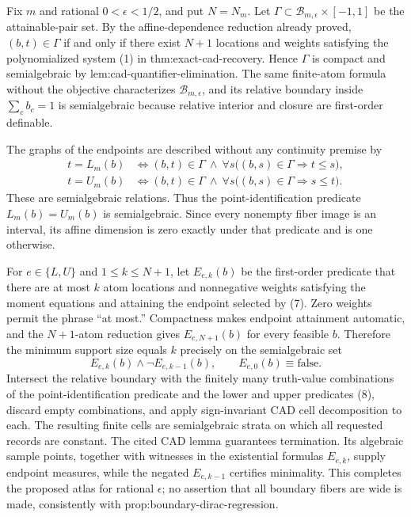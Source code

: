 Fix \(m\) and rational \(0<\epsilon<1/2\), and put \(N=N_m\).  Let \(\Gamma\subset\mathcal B_{m,\epsilon}\times[-1,1]\) be the attainable-pair set.  By the affine-dependence reduction already proved, \((b,t)\in\Gamma\) if and only if there exist \(N+1\) locations and weights satisfying the polynomialized system (1) in thm:exact-cad-recovery.  Hence \(\Gamma\) is compact and semialgebraic by lem:cad-quantifier-elimination.  The same finite-atom formula without the objective characterizes \(\mathcal B_{m,\epsilon}\), and its relative boundary inside \(\sum_cb_c=1\) is semialgebraic because relative interior and closure are first-order definable.

The graphs of the endpoints are described without any continuity premise by
\[
 \begin{aligned}
 t=L_m(b)&\Longleftrightarrow (b,t)\in\Gamma
 \ \wedge\ \forall s\bigl((b,s)\in\Gamma\Rightarrow t\leq s\bigr),\\
 t=U_m(b)&\Longleftrightarrow (b,t)\in\Gamma
 \ \wedge\ \forall s\bigl((b,s)\in\Gamma\Rightarrow s\leq t\bigr).
 \end{aligned}
\tag{7}
\]
These are semialgebraic relations.  Thus the point-identification predicate \(L_m(b)=U_m(b)\) is semialgebraic.  Since every nonempty fiber image is an interval, its affine dimension is zero exactly under that predicate and is one otherwise.

For \(e\in\{L,U\}\) and \(1\leq k\leq N+1\), let \(E_{e,k}(b)\) be the first-order predicate that there are at most \(k\) atom locations and nonnegative weights satisfying the moment equations and attaining the endpoint selected by (7).  Zero weights permit the phrase ``at most.''  Compactness makes endpoint attainment automatic, and the \(N+1\)-atom reduction gives \(E_{e,N+1}(b)\) for every feasible \(b\).  Therefore the minimum support size equals \(k\) precisely on the semialgebraic set
\[
 E_{e,k}(b)\wedge\neg E_{e,k-1}(b),
 \qquad E_{e,0}(b)\equiv\mathrm{false}.
\tag{8}
\]
Intersect the relative boundary with the finitely many truth-value combinations of the point-identification predicate and the lower and upper predicates (8), discard empty combinations, and apply sign-invariant CAD cell decomposition to each.  The resulting finite cells are semialgebraic strata on which all requested records are constant.  The cited CAD lemma guarantees termination.  Its algebraic sample points, together with witnesses in the existential formulas \(E_{e,k}\), supply endpoint measures, while the negated \(E_{e,k-1}\) certifies minimality.  This completes the proposed atlas for rational \(\epsilon\); no assertion that all boundary fibers are wide is made, consistently with prop:boundary-dirac-regression.